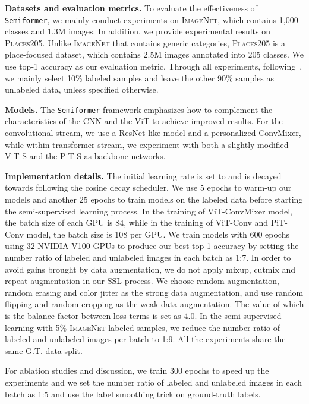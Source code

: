 \documentclass[runningheads]{llncs}
\makeatletter
\newcommand{\fakeparagraph}[1]{\textbf{#1}}
\newcommand*{\system}{\texttt{Semiformer}\@\xspace}
\newcommand{\inet}{{\scshape ImageNet}\xspace}
\newcommand{\places}{{\scshape Places205}\xspace}
\makeatother
\begin{document}
\fakeparagraph{Datasets and evaluation metrics.}  To evaluate the effectiveness of \system, we mainly conduct experiments on \inet \cite{deng2009imagenet}, which contains 1,000 classes and 1.3M images.  In addition, we provide experimental results on \places. Unlike \inet that contains generic categories, \places is a place-focused dataset, which contains 2.5M images annotated into 205 classes. We use top-1 accuracy as our evaluation metric.  Through all experiments, following~\cite{sohn2020fixmatch}, we mainly select 10\% labeled samples and leave the other 90\% samples as unlabeled data, unless specified otherwise. 

\fakeparagraph{Models.} 
The \system framework emphasizes how to complement the characteristics of the CNN and the ViT to achieve improved results. 
For the convolutional stream, we use a ResNet-like model and a personalized ConvMixer\cite{trockman2022patches}, while within transformer stream, we experiment with both a slightly modified ViT-S\cite{touvron2021training} and the PiT-S\cite{heo2021rethinking} as backbone networks.

\fakeparagraph{Implementation details.} The initial learning rate is set to  and is decayed towards  following the cosine decay scheduler. We use 5 epochs to warm-up our models and another 25 epochs to train models on the labeled data before starting the semi-supervised learning process. In the training of ViT-ConvMixer model, the batch size of each GPU is 84, while in the training of ViT-Conv and PiT-Conv model, the batch size is 108 per GPU.  We train models with 600 epochs using 32 NVIDIA V100 GPUs to produce our best top-1 accuracy by setting the number ratio of labeled and unlabeled images in each batch as 1:7. In order to avoid gains brought by data augmentation, we do not apply mixup, cutmix and repeat augmentation in our SSL process. We choose random augmentation, random erasing and color jitter as the strong data augmentation, and use random flipping and random cropping as the weak data augmentation. The value of  which is the balance factor between loss terms is set as 4.0. In the semi-supervised learning with 5\% \inet labeled samples, we reduce the number ratio of labeled and unlabeled images per batch to 1:9. All the experiments share the same G.T. data split.

For ablation studies and discussion, we train 300 epochs to speed up the experiments and we set the number ratio of labeled and unlabeled images in each batch as 1:5 and use the label smoothing trick on ground-truth labels.
\end{document}
